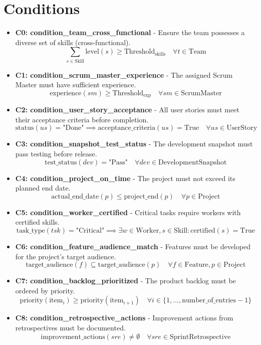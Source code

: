 \documentclass[11pt]{article}
\begin{document}
\section{Conditions}
\begin{itemize}
    \item \textbf{C0: condition\_team\_cross\_functional} - Ensure the team possesses a diverse set of skills (cross-functional).
        \[ \sum_{s \in \text{Skill}} \text{level}(s) \geq \text{Threshold}_{\text{skills}} \quad \forall t \in \text{Team} \]
    \item \textbf{C1: condition\_scrum\_master\_experience} - The assigned Scrum Master must have sufficient experience.
        \[ \text{experience}(sm) \geq \text{Threshold}_{\text{exp}} \quad \forall sm \in \text{ScrumMaster} \]
    \item \textbf{C2: condition\_user\_story\_acceptance} - All user stories must meet their acceptance criteria before completion.
        \[ \text{status}(us) = \text{"Done"} \implies \text{acceptance\_criteria}(us) = \text{True} \quad \forall us \in \text{UserStory} \]
    \item \textbf{C3: condition\_snapshot\_test\_status} - The development snapshot must pass testing before release.
        \[ \text{test\_status}(dev) = \text{"Pass"} \quad \forall dev \in \text{DevelopmentSnapshot} \]
    \item \textbf{C4: condition\_project\_on\_time} - The project must not exceed its planned end date.
        \[ \text{actual\_end\_date}(p) \leq \text{project\_end}(p) \quad \forall p \in \text{Project} \]
    \item \textbf{C5: condition\_worker\_certified} - Critical tasks require workers with certified skills.
        \[ \text{task\_type}(tsk) = \text{"Critical"} \implies \exists w \in \text{Worker}, s \in \text{Skill}: \text{certified}(s) = \text{True} \]
    \item \textbf{C6: condition\_feature\_audience\_match} - Features must be developed for the project's target audience.
        \[ \text{target\_audience}(f) \subseteq \text{target\_audience}(p) \quad \forall f \in \text{Feature}, p \in \text{Project} \]
    \item \textbf{C7: condition\_backlog\_prioritized} - The product backlog must be ordered by priority.
        \[ \text{priority}(\text{item}_i) \geq \text{priority}(\text{item}_{i+1}) \quad \forall i \in \{1, ..., \text{number\_of\_entries}-1\} \]
    \item \textbf{C8: condition\_retrospective\_actions} - Improvement actions from retrospectives must be documented.
        \[ \text{improvement\_actions}(sre) \neq \emptyset \quad \forall sre \in \text{SprintRetrospective} \]
\end{itemize}
\end{document}

